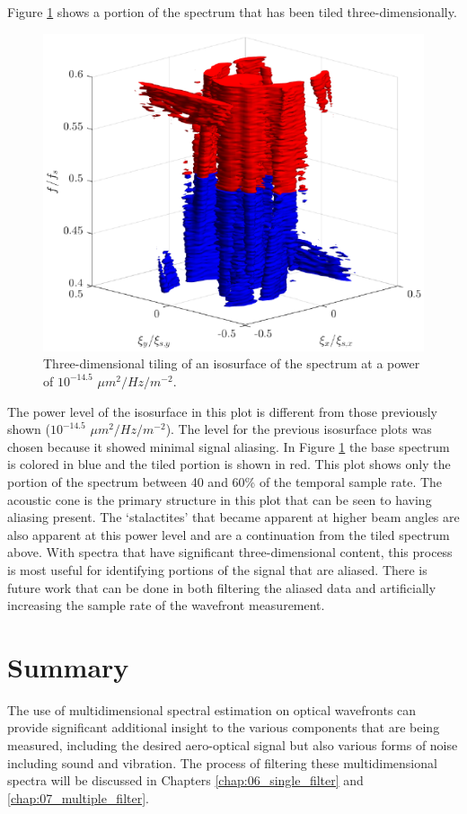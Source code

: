 Figure \ref{fig:04_dispersion_3d_tile} shows a portion of the spectrum that has been tiled three-dimensionally.
\begin{figure}
  \centering
  \includegraphics{../matlab/04_dispersion_analysis/dispersion_3d_tile.eps}
  \caption{Three-dimensional tiling of an isosurface of the spectrum at a power of $10^{-14.5}$ $\mu m^2/Hz/m^{-2}$.}
  \label{fig:04_dispersion_3d_tile}
\end{figure}
The power level of the isosurface in this plot is different from those previously shown ($10^{-14.5}$ $\mu m^2/Hz/m^{-2}$).
The level for the previous isosurface plots was chosen because it showed minimal signal aliasing.
In Figure \ref{fig:04_dispersion_3d_tile} the base spectrum is colored in blue and the tiled portion is shown in red.
This plot shows only the portion of the spectrum between 40 and 60\% of the temporal sample rate.
The acoustic cone is the primary structure in this plot that can be seen to having aliasing present.
The `stalactites' that became apparent at higher beam angles are also apparent at this power level and are a continuation from the tiled spectrum above.
With spectra that have significant three-dimensional content, this process is most useful for identifying portions of the signal that are aliased.
There is future work that can be done in both filtering the aliased data and artificially increasing the sample rate of the wavefront measurement.

\section{Summary}
The use of multidimensional spectral estimation on optical wavefronts can provide significant additional insight to the various components that are being measured, including the desired aero-optical signal but also various forms of noise including sound and vibration.
The process of filtering these multidimensional spectra will be discussed in Chapters \ref{chap:06_single_filter} and \ref{chap:07_multiple_filter}.
